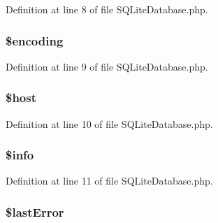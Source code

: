 Definition at line 8 of file S\+Q\+Lite\+Database.\+php.

\hypertarget{class_s_q_lite_database_aee271b7ce67fbe00b9976e6c347cbfbf}{}
\subsubsection[{\$encoding}]{\setlength{\rightskip}{0pt plus 5cm}\$encoding\hspace{0.3cm}{\ttfamily [protected]}}\label{class_s_q_lite_database_aee271b7ce67fbe00b9976e6c347cbfbf}


Definition at line 9 of file S\+Q\+Lite\+Database.\+php.

\hypertarget{class_s_q_lite_database_a711797613cb863ca0756df789c396bf2}{}
\subsubsection[{\$host}]{\setlength{\rightskip}{0pt plus 5cm}\$host\hspace{0.3cm}{\ttfamily [protected]}}\label{class_s_q_lite_database_a711797613cb863ca0756df789c396bf2}


Definition at line 10 of file S\+Q\+Lite\+Database.\+php.

\hypertarget{class_s_q_lite_database_ae19722790c6683980bbf0af8572f26ab}{}
\subsubsection[{\$info}]{\setlength{\rightskip}{0pt plus 5cm}\$info\hspace{0.3cm}{\ttfamily [protected]}}\label{class_s_q_lite_database_ae19722790c6683980bbf0af8572f26ab}


Definition at line 11 of file S\+Q\+Lite\+Database.\+php.

\hypertarget{class_s_q_lite_database_a6cb6be70a528323568af007db6a3885e}{}
\subsubsection[{\$last\+Error}]{\setlength{\rightskip}{0pt plus 5cm}\$last\+Error\hspace{0.3cm}{\ttfamily [protected]}}\label{class_s_q_lite_database_a6cb6be70a528323568af007db6a3885e}


